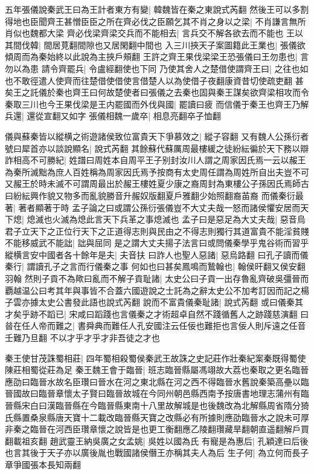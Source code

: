 五年張儀說秦武王曰為王計者東方有變|{
	韓魏皆在秦之東說式芮翻}
然後王可以多割得地也臣聞齊王甚憎臣臣之所在齊必伐之臣願乞其不肖之身以之梁|{
	不肖謙言無所肖似也魏都大梁}
齊必伐梁齊梁交兵而不能相去|{
	言兵交不解各欲去而不能也}
王以其間伐韓|{
	間居莧翻間隙也又居閑翻中間也}
入三川挾天子案圖籍此王業也|{
	張儀欲傾周而為秦始終以此說為主挾戶頰翻}
王許之齊王果伐梁梁王恐張儀曰王勿患也|{
	言勿以為患}
請令齊罷兵|{
	令盧經翻使也下同}
乃使其舍人之楚借使謂齊王曰|{
	之往也如也不敢徑遣人使齊而往楚借使借使言借楚人以為使借子夜翻康資昔切使疏吏翻}
甚矣王之託儀於秦也齊王曰何故楚使者曰張儀之去秦也固與秦王謀矣欲齊梁相攻而令秦取三川也今王果伐梁是王内罷國而外伐與國|{
	罷讀曰疲}
而信儀于秦王也齊王乃解兵還|{
	還從宣翻又如字}
張儀相魏一歲卒|{
	相息亮翻卒子恤翻}


儀與蘇秦皆以縱横之術遊諸侯致位富貴天下爭慕效之|{
	縱子容翻}
又有魏人公孫衍者號曰犀首亦以談說顯名|{
	說式芮翻}
其餘蘇代蘇厲周最樓緩之徒紛紜徧於天下務以辯詐相高不可勝紀|{
	姓譜曰周姓本自周平王子别封汝川人謂之周家因氏焉一云以赧王為秦所滅黜為庶人百姓稱為周家因氏焉予按商有太史周任謂為周姓所自出夫豈不可又赧王於時未滅不可謂周最出於赧王樓姓夏少康之裔周封為東樓公子孫因氏焉師古曰紛紜興作貌又物多而亂貌勝音升赧奴版翻夏戶雅翻少始照翻裔苖裔}
而儀秦衍最著|{
	著者顯著于時}
孟子論之曰或謂公孫衍張儀豈不大丈夫哉一怒而諸侯懼安居而天下熄|{
	熄滅也火滅為熄此言天下兵革之事熄滅也}
孟子曰是惡足為大丈夫哉|{
	惡音烏}
君子立天下之正位行天下之正道得志則與民由之不得志則獨行其道富貴不能淫貧賤不能移威武不能詘|{
	詘與屈同}
是之謂大丈夫揚子法言曰或問儀秦學乎鬼谷術而習乎縱横言安中國者各十餘年是夫|{
	夫音扶}
曰詐人也聖人惡諸|{
	惡烏路翻}
曰孔子讀而儀秦行|{
	謂讀孔子之言而行儀秦之事}
何如也曰甚矣鳳鳴而鷙翰也|{
	翰侯旰翻又侯安翻羽翰}
然則子貢不為歟曰亂而不解子貢耻諸|{
	太史公曰子貢一出存魯亂齊破吳彊晉而覇越温公曰考其年與事皆不合蓋六國遊說之士託為之辭太史公不加考訂因而記之楊子雲亦據太史公書發此語也說式芮翻}
說而不富貴儀秦耻諸|{
	說式芮翻}
或曰儀秦其才矣乎跡不蹈已|{
	宋咸曰蹈踐也言儀秦之才術超卓自然不踐循舊人之跡踐慈演翻}
曰㫺在任人帝而難之|{
	書舜典而難任人孔安國注云任佞也難拒也言佞人則斥遠之任音壬難乃旦翻}
不以才乎才乎才非吾徒之才也

秦王使甘茂誅蜀相莊|{
	四年蜀相殺蜀侯秦武王故誅之史記莊作壯秦紀案秦既得蜀使陳莊相蜀從莊為足}
秦王魏王會于臨晉|{
	班志臨晉縣屬馮翊故大荔也秦取之更名臨晉應劭曰臨晉水故名臣瓚曰晉水在河之東北縣在河之西不得臨晉水舊說秦築高壘以臨晉國故曰臨晉章懷太子賢曰臨晉故城在今同州朝邑縣西南予按唐書地理志蒲州有臨晉縣宋白曰漢臨晉縣在今臨晉縣東南十八里故解城是也後魏改為北解縣周省隋分猗氏縣置桑泉縣唐天寶十二載改臨晉縣天寶之改縣必有所據則應劭臨晉水之說未可厚非秦之臨晉在河西臣瓚章懷之說皆是也更工衡翻應乙陵翻瓚藏旱翻朝直遥翻解戶買翻載祖亥翻}
趙武靈王納吳廣之女孟姚|{
	吳姓以國為氏}
有寵是為惠后|{
	孔穎達曰后後也言其後于天子亦以廣後胤也戰國諸侯僭王亦稱其夫人為后}
生子何|{
	為立何而長子章爭國張本長知兩翻}


